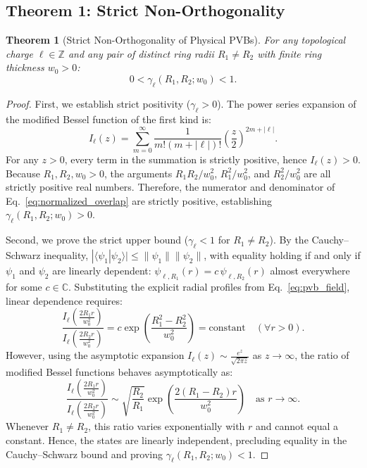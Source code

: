 \documentclass{optica-article}
\newtheorem{theorem}{Theorem}
\begin{document}
\subsection{Theorem 1: Strict Non-Orthogonality}

\begin{theorem}[Strict Non-Orthogonality of Physical PVBs]
For any topological charge $\ell \in \mathbb{Z}$ and any pair of distinct ring radii $R_1 \neq R_2$ with finite ring thickness $w_0 > 0$:
\begin{equation}
0 < \gamma_\ell(R_1, R_2; w_0) < 1.
\end{equation}
\end{theorem}

\begin{proof}
First, we establish strict positivity ($\gamma_\ell > 0$). The power series expansion of the modified Bessel function of the first kind is:
\begin{equation}
I_\ell(z) = \sum_{m=0}^\infty \frac{1}{m! (m + |\ell|)!} \left(\frac{z}{2}\right)^{2m + |\ell|}.
\end{equation}
For any $z > 0$, every term in the summation is strictly positive, hence $I_\ell(z) > 0$. Because $R_1, R_2, w_0 > 0$, the arguments $R_1 R_2 / w_0^2$, $R_1^2 / w_0^2$, and $R_2^2 / w_0^2$ are all strictly positive real numbers. Therefore, the numerator and denominator of Eq.~\eqref{eq:normalized_overlap} are strictly positive, establishing $\gamma_\ell(R_1, R_2; w_0) > 0$.

Second, we prove the strict upper bound ($\gamma_\ell < 1$ for $R_1 \neq R_2$). By the Cauchy--Schwarz inequality, $|\langle \psi_1 | \psi_2 \rangle| \le \|\psi_1\| \|\psi_2\|$, with equality holding if and only if $\psi_1$ and $\psi_2$ are linearly dependent: $\psi_{\ell, R_1}(r) = c \, \psi_{\ell, R_2}(r)$ almost everywhere for some $c \in \mathbb{C}$. Substituting the explicit radial profiles from Eq.~\eqref{eq:pvb_field}, linear dependence requires:
\begin{equation}
\frac{I_\ell\left( \frac{2 R_1 r}{w_0^2} \right)}{I_\ell\left( \frac{2 R_2 r}{w_0^2} \right)} = c \exp\left( \frac{R_1^2 - R_2^2}{w_0^2} \right) = \text{constant} \quad (\forall r > 0).
\end{equation}
However, using the asymptotic expansion $I_\ell(z) \sim \frac{e^z}{\sqrt{2\pi z}}$ as $z \to \infty$, the ratio of modified Bessel functions behaves asymptotically as:
\begin{equation}
\frac{I_\ell\left( \frac{2 R_1 r}{w_0^2} \right)}{I_\ell\left( \frac{2 R_2 r}{w_0^2} \right)} \sim \sqrt{\frac{R_2}{R_1}} \exp\left( \frac{2(R_1 - R_2) r}{w_0^2} \right) \quad \text{as } r \to \infty.
\end{equation}
Whenever $R_1 \neq R_2$, this ratio varies exponentially with $r$ and cannot equal a constant. Hence, the states are linearly independent, precluding equality in the Cauchy--Schwarz bound and proving $\gamma_\ell(R_1, R_2; w_0) < 1$.
\end{proof}
\end{document}
